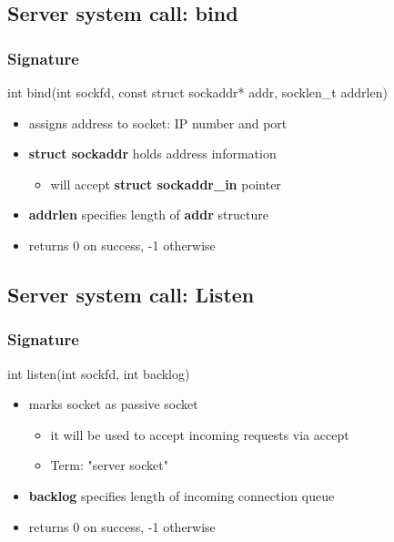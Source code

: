 \documentclass{report}
\begin{document}
    \pagebreak 
    \subsection{Server system call: bind}
    \bigbreak \noindent 
    \subsubsection{Signature}
    \bigbreak \noindent 
    \begin{cppcode}
    int bind(int sockfd, const struct sockaddr* addr, socklen_t addrlen)
    \end{cppcode}
    \begin{itemize}
        \item assigns address to socket: IP number and port
        \item \textbf{struct sockaddr} holds address information
            \begin{itemize}
                \item will accept \textbf{struct sockaddr\_in} pointer
            \end{itemize}
        \item \textbf{addrlen} specifies length of \textbf{addr} structure
        \item returns 0 on success, -1 otherwise
    \end{itemize}

    \bigbreak \noindent 
    \subsection{Server system call: Listen}
    \bigbreak \noindent 
    \subsubsection{Signature}
    \bigbreak \noindent 
    \begin{cppcode}
    int listen(int sockfd, int backlog)
    \end{cppcode}
    \bigbreak \noindent 
    \begin{itemize}
        \item marks socket as passive socket
            \begin{itemize}
                \item it will be used to accept incoming requests via accept
                \item Term: "server socket"
            \end{itemize}
        \item \textbf{backlog} specifies length of incoming connection queue
        \item returns 0 on success, -1 otherwise
    \end{itemize}
\end{document}
